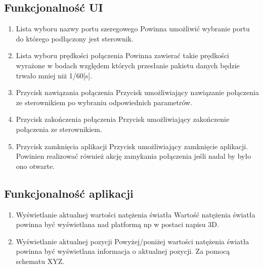 \documentclass[10pt, a4paper]{article}
\begin{document}
	\subsection{Funkcjonalność UI}
		\begin{enumerate}
			\item Lista wyboru nazwy portu szeregowego
				\newline
				Powinna umożliwić wybranie portu do którego podłączony jest sterownik.
			\item Lista wyboru prędkości połączenia
				\newline
				Powinna zawierać takie prędkości wyrażone w bodach względem których przesłanie pakietu danych będzie trwało mniej niż 1/60[s]. 
			\item Przycisk nawiązania połączenia
				\newline
				Przycisk umożliwiający nawiązanie połączenia ze sterownikiem po wybraniu odpowiednich parametrów.
			\item Przycisk zakończenia połączenia
				\newline
				Przycisk umożliwiający zakończenie połączenia ze sterownikiem.
			\item Przycisk zamknięcia aplikacji
				\newline
				Przycisk umożliwiający zamknięcie aplikacji. Powinien realizować również akcję zamykania połączenia jeśli nadal by było ono otwarte.	
		\end{enumerate}
	
	\subsection{Funkcjonalność aplikacji}
		\begin{enumerate}
			\item Wyświetlanie aktualnej wartości natężenia światła
				\newline	
				Wartość natężenia światła powinna być wyświetlana nad platformą np w postaci napisu 3D.
			\item Wyświetlanie aktualnej pozycji
				\newline	
				Powyżej/poniżej wartości natężenia światła powinna być wyświetlana informacja o aktualnej pozycji. Za pomocą schematu XYZ.
		\end{enumerate}
	
\end{document}
